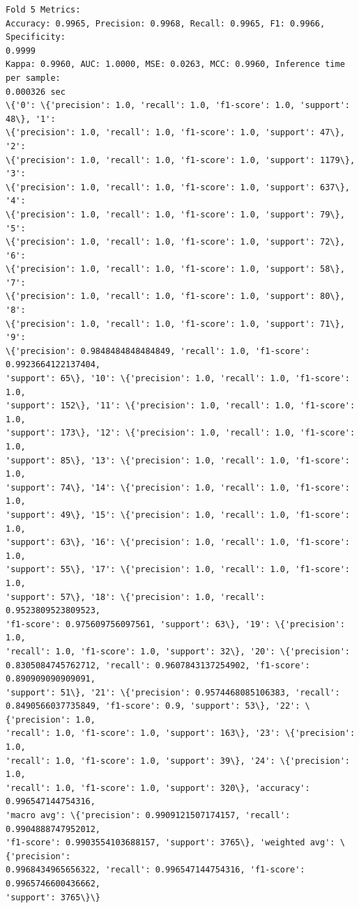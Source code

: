 \documentclass[11pt]{article}
\begin{document}
    \begin{Verbatim}[commandchars=\\\{\}]
Fold 5 Metrics:
Accuracy: 0.9965, Precision: 0.9968, Recall: 0.9965, F1: 0.9966, Specificity:
0.9999
Kappa: 0.9960, AUC: 1.0000, MSE: 0.0263, MCC: 0.9960, Inference time per sample:
0.000326 sec
\{'0': \{'precision': 1.0, 'recall': 1.0, 'f1-score': 1.0, 'support': 48\}, '1':
\{'precision': 1.0, 'recall': 1.0, 'f1-score': 1.0, 'support': 47\}, '2':
\{'precision': 1.0, 'recall': 1.0, 'f1-score': 1.0, 'support': 1179\}, '3':
\{'precision': 1.0, 'recall': 1.0, 'f1-score': 1.0, 'support': 637\}, '4':
\{'precision': 1.0, 'recall': 1.0, 'f1-score': 1.0, 'support': 79\}, '5':
\{'precision': 1.0, 'recall': 1.0, 'f1-score': 1.0, 'support': 72\}, '6':
\{'precision': 1.0, 'recall': 1.0, 'f1-score': 1.0, 'support': 58\}, '7':
\{'precision': 1.0, 'recall': 1.0, 'f1-score': 1.0, 'support': 80\}, '8':
\{'precision': 1.0, 'recall': 1.0, 'f1-score': 1.0, 'support': 71\}, '9':
\{'precision': 0.9848484848484849, 'recall': 1.0, 'f1-score': 0.9923664122137404,
'support': 65\}, '10': \{'precision': 1.0, 'recall': 1.0, 'f1-score': 1.0,
'support': 152\}, '11': \{'precision': 1.0, 'recall': 1.0, 'f1-score': 1.0,
'support': 173\}, '12': \{'precision': 1.0, 'recall': 1.0, 'f1-score': 1.0,
'support': 85\}, '13': \{'precision': 1.0, 'recall': 1.0, 'f1-score': 1.0,
'support': 74\}, '14': \{'precision': 1.0, 'recall': 1.0, 'f1-score': 1.0,
'support': 49\}, '15': \{'precision': 1.0, 'recall': 1.0, 'f1-score': 1.0,
'support': 63\}, '16': \{'precision': 1.0, 'recall': 1.0, 'f1-score': 1.0,
'support': 55\}, '17': \{'precision': 1.0, 'recall': 1.0, 'f1-score': 1.0,
'support': 57\}, '18': \{'precision': 1.0, 'recall': 0.9523809523809523,
'f1-score': 0.975609756097561, 'support': 63\}, '19': \{'precision': 1.0,
'recall': 1.0, 'f1-score': 1.0, 'support': 32\}, '20': \{'precision':
0.8305084745762712, 'recall': 0.9607843137254902, 'f1-score': 0.890909090909091,
'support': 51\}, '21': \{'precision': 0.9574468085106383, 'recall':
0.8490566037735849, 'f1-score': 0.9, 'support': 53\}, '22': \{'precision': 1.0,
'recall': 1.0, 'f1-score': 1.0, 'support': 163\}, '23': \{'precision': 1.0,
'recall': 1.0, 'f1-score': 1.0, 'support': 39\}, '24': \{'precision': 1.0,
'recall': 1.0, 'f1-score': 1.0, 'support': 320\}, 'accuracy': 0.996547144754316,
'macro avg': \{'precision': 0.9909121507174157, 'recall': 0.9904888747952012,
'f1-score': 0.9903554103688157, 'support': 3765\}, 'weighted avg': \{'precision':
0.9968434965656322, 'recall': 0.996547144754316, 'f1-score': 0.9965746600436662,
'support': 3765\}\}


\end{Verbatim}
\end{document}
